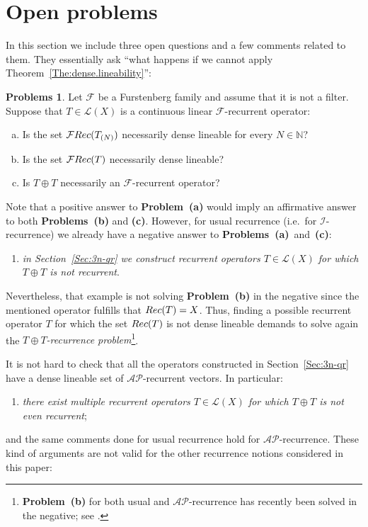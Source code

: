 \documentclass[openright,11pt]{article}
\theoremstyle{plain}
\theoremstyle{definition}
\newtheorem{problems}[theorem]{Problems}
\newcommand{\NN}{\mathbb{N}}
\newcommand{\AP}{\mathcal{AP}}
\newcommand{\Fc}{\mathcal{F}}
\newcommand{\Ic}{\mathcal{I}}
\newcommand{\Lc}{\mathcal{L}}
\newcommand{\Rec}{\textup{Rec}}
\begin{document}
\section{Open problems}\label{Sec:6open}

In this section we include three open questions and a few comments related to them. They essentially ask ``what happens if we cannot apply Theorem~\ref{The:dense.lineability}'': 

\begin{problems}
	Let $\Fc$ be a Furstenberg family and assume that it is not a filter. Suppose that $T \in \Lc(X)$ is a continuous linear $\Fc$-recurrent operator:
	\begin{enumerate}[(a)]
		\item Is the set $\Fc\Rec(T_{(N)})$ necessarily dense lineable for every $N \in \NN$?
		
		\item Is the set $\Fc\Rec(T)$ necessarily dense lineable?
		
		\item Is $T\oplus T$ necessarily an $\Fc$-recurrent operator?
	\end{enumerate}
\end{problems}

Note that a positive answer to \textbf{Problem~(a)} would imply an affirmative answer to both \textbf{Problems~(b)} and \textbf{(c)}. However, for usual recurrence (i.e.\ for $\Ic$-recurrence) we already have a negative answer to \textbf{Problems~(a)}~and~\textbf{(c)}:
\begin{enumerate}[--]
	\item {\em in Section~\ref{Sec:3n-qr} we construct recurrent operators $T \in \Lc(X)$ for which $T\oplus T$ is not recurrent}. 
\end{enumerate}
Nevertheless, that example is not solving \textbf{Problem~(b)} in the negative since the mentioned operator fulfills that $\Rec(T)=X$. Thus, finding a possible recurrent operator $T$ for which the set $\Rec(T)$ is not dense lineable demands to solve again the {\em $T\oplus T$-recurrence problem}\footnote{\textbf{Problem~(b)} for both usual and $\AP$-recurrence has recently been solved in the negative; see \cite{LoMe2024_JMAA}.}.\newpage

It is not hard to check that all the operators constructed in Section~\ref{Sec:3n-qr} have a dense lineable set of $\AP$-recurrent vectors. In particular:
\begin{enumerate}[--]
	\item {\em there exist multiple recurrent operators $T \in \Lc(X)$ for which $T\oplus T$ is not even recurrent};
\end{enumerate}
and the same comments done for usual recurrence hold for $\AP$-recurrence. These kind of arguments are not valid for the other recurrence notions considered in this paper:
\end{document}
